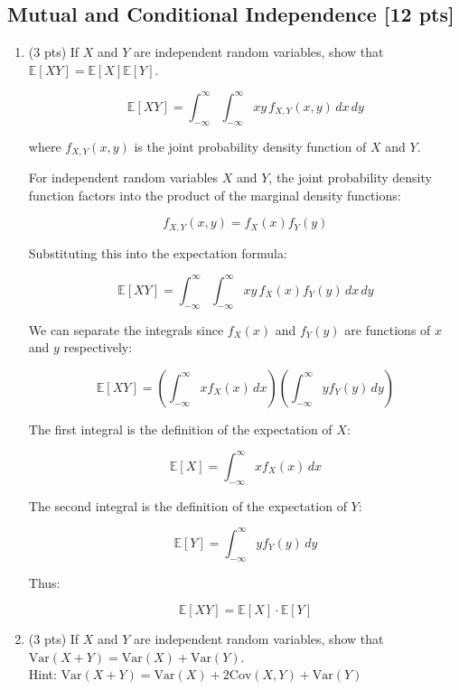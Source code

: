\documentclass[letter]{article}
\theoremstyle{definition}
\newcommand{\Var}{\mathrm{Var}}
\newcommand{\Cov}{\mathrm{Cov}}
\newenvironment{soln}{
	\leavevmode\color{black}\ignorespaces
}{}
\begin{document}
	\subsection{Mutual and Conditional Independence [12 pts]}
	\begin{enumerate}
		\item (3 pts) If $X$ and $Y$ are independent random variables, show that
		$\mathbb{E}[XY] = \mathbb{E}[X]\mathbb{E}[Y]$.
		
		\begin{soln}
			\[
			\mathbb{E}[XY] = \int_{-\infty}^{\infty} \int_{-\infty}^{\infty} xy \, f_{X,Y}(x, y) \, dx \, dy
			\]
			
			where \(f_{X,Y}(x, y)\) is the joint probability density function of \(X\) and \(Y\). 
			
			For independent random variables \(X\) and \(Y\), the joint probability density function factors into the product of the marginal density functions:
			
			\[
			f_{X,Y}(x, y) = f_X(x) f_Y(y)
			\]
			
			Substituting this into the expectation formula:
			
			\[
			\mathbb{E}[XY] = \int_{-\infty}^{\infty} \int_{-\infty}^{\infty} xy \, f_X(x) f_Y(y) \, dx \, dy
			\]
			
			We can separate the integrals since \(f_X(x)\) and \(f_Y(y)\) are functions of \(x\) and \(y\) respectively:
			
			\[
			\mathbb{E}[XY] = \left( \int_{-\infty}^{\infty} x f_X(x) \, dx \right) \left( \int_{-\infty}^{\infty} y f_Y(y) \, dy \right)
			\]
			
			The first integral is the definition of the expectation of \(X\):
			
			\[
			\mathbb{E}[X] = \int_{-\infty}^{\infty} x f_X(x) \, dx
			\]
			
			The second integral is the definition of the expectation of \(Y\):
			
			\[
			\mathbb{E}[Y] = \int_{-\infty}^{\infty} y f_Y(y) \, dy
			\]
			
			Thus:
			
			\[
			\mathbb{E}[XY] = \mathbb{E}[X] \cdot \mathbb{E}[Y]
			\]
		\end{soln}
		
		\item (3 pts) If $X$ and $Y$ are independent random variables, show that
		$\Var(X+Y) = \Var(X) + \Var(Y)$. \\
		Hint: $\Var(X+Y) = \Var(X) + 2\Cov(X, Y) + \Var(Y)$
		

\end{enumerate}
\end{document}
